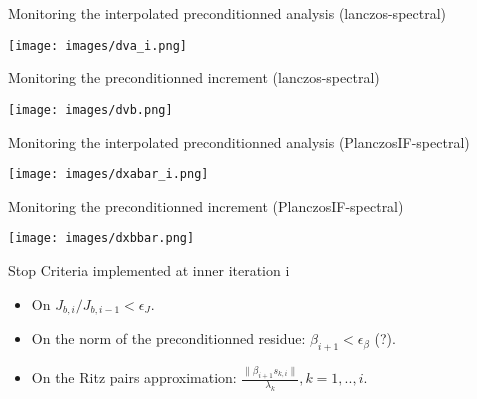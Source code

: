 \documentclass[francais]{beamer}
\begin{document}
\begin{frame}{Monitoring the interpolated preconditionned analysis (lanczos-spectral)}
\begin{center}
 \texttt{[image: images/dva\_i.png]}
\end{center}
\end{frame}
\begin{frame}{Monitoring the preconditionned increment (lanczos-spectral)}
\begin{center}
 \texttt{[image: images/dvb.png]}
\end{center}
\end{frame}
\begin{frame}{Monitoring the interpolated preconditionned analysis (PlanczosIF-spectral)}
\begin{center}
 \texttt{[image: images/dxabar\_i.png]}
\end{center}
\end{frame}
\begin{frame}{Monitoring the preconditionned increment (PlanczosIF-spectral)}
\begin{center}
 \texttt{[image: images/dxbbar.png]}
\end{center}
\end{frame}


\begin{frame}{Stop Criteria implemented at inner iteration i}
\begin{itemize}
 \item On $J_{b,i}/J_{b,i-1} < \epsilon_J$.\\
 \item On the norm of the preconditionned residue: $\beta_{i+1} < \epsilon_\beta$ (?).
 \item On the Ritz pairs approximation: $\frac{\|\beta_{i+1} s_{k,i}\|}{\lambda_k}, k=1,..,i.$
\end{itemize}
\end{frame}
\end{document}
